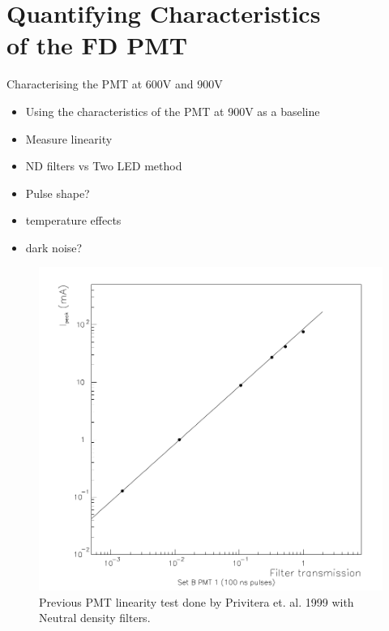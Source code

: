 \chapter[Quantifying Characteristics of the FD PMT]{\centering Quantifying Characteristics \\ of the FD PMT \\}\label{Ch:PMTCharacter}

Characterising the PMT at 600V and 900V
\begin{itemize}
\item Using the characteristics of the PMT at 900V as a baseline
\item Measure linearity
\item ND filters vs Two LED method
\item Pulse shape?
\item temperature effects
\item dark noise?
\end{itemize}

\begin{figure}
\centering
\includegraphics[width=\textwidth]{chapters/graphs/PMTchar/pmt_linearity_100V_privitera.png}
\caption{Previous PMT linearity test done by Privitera et. al. 1999 with Neutral density filters.}
\end{figure}

